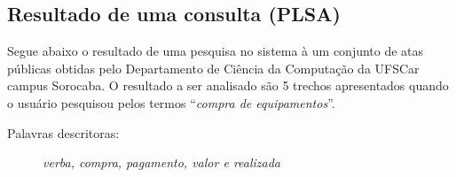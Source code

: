 \newpage

\subsection*{Resultado de uma consulta (PLSA)}

Segue abaixo o resultado de uma pesquisa no sistema à um conjunto de atas públicas obtidas pelo Departamento de Ciência da Computação da UFSCar campus Sorocaba. O resultado a ser analisado são 5 trechos apresentados quando o usuário pesquisou pelos termos ``\textit{compra de equipamentos}''.

\vspace{0.5 cm}

\begin{description}
	\item[Palavras descritoras: ] \textit{verba, compra, pagamento, valor e realizada}
\end{description}



